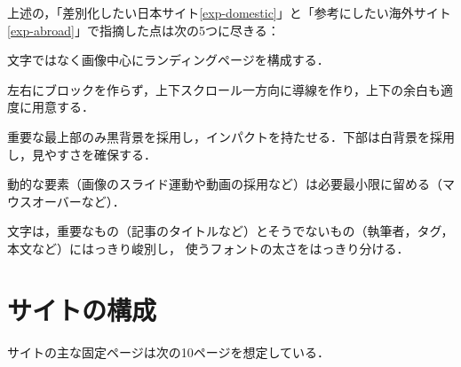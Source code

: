 \documentclass[uplatex,dvipdfmx]{jsarticle}
\begin{document}
\begin{tcolorbox}[colframe=ForestGreen, colback=ForestGreen!10!white,breakable,colbacktitle=ForestGreen!40!white,coltitle=black,fonttitle=\bfseries\sffamily,
title=まとめ]
    上述の，「差別化したい日本サイト\ref{exp-domestic}」と「参考にしたい海外サイト\ref{exp-abroad}」で指摘した点は次の5つに尽きる：
    \begin{enumerate}[{[}1{]}]
        \item 文字ではなく画像中心にランディングページを構成する．
        \item 左右にブロックを作らず，上下スクロール一方向に導線を作り，上下の余白も適度に用意する．
        \item 重要な最上部のみ黒背景を採用し，インパクトを持たせる．下部は白背景を採用し，見やすさを確保する．
        \item 動的な要素（画像のスライド運動や動画の採用など）は必要最小限に留める（マウスオーバーなど）．
        \item 文字は，重要なもの（記事のタイトルなど）とそうでないもの（執筆者，タグ，本文など）にはっきり峻別し，
        使うフォントの太さをはっきり分ける．
    \end{enumerate}
\end{tcolorbox}

\section{サイトの構成}

\begin{tcolorbox}[colframe=ForestGreen, colback=ForestGreen!10!white,breakable,colbacktitle=ForestGreen!40!white,coltitle=black,fonttitle=\bfseries\sffamily,
title=]
    サイトの主な固定ページは次の10ページを想定している．
\end{tcolorbox}
\end{document}
